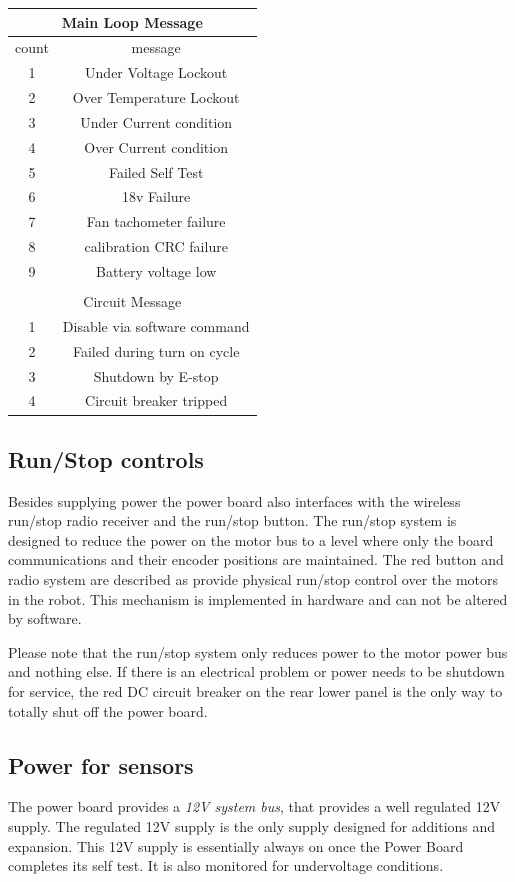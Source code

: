 \begin{tabular}{|c|c|}
\hline
\multicolumn{2}{|c|}{Main Loop Message} \\
\hline
count &  message \\
\hline
\hline
1 & Under Voltage Lockout \\
\hline
2 & Over Temperature Lockout \\
\hline
3 & Under Current condition \\
\hline
4 & Over Current condition \\
\hline
5 & Failed Self Test \\
\hline
6 & 18v Failure \\
\hline
7 & Fan tachometer failure \\
\hline
8 & calibration CRC failure \\
\hline
9 & Battery voltage low  \\
\hline
& \\
\hline
\multicolumn{2}{|c|}{Circuit Message} \\
\hline
1 & Disable via software command \\
\hline
2 & Failed during turn on cycle \\
\hline
3 & Shutdown by E-stop \\
\hline
4 & Circuit breaker tripped  \\
\hline
\end{tabular}

\subsection {Run/Stop controls}

Besides supplying power the power board also interfaces with the wireless run/stop
radio receiver and the run/stop button. The run/stop system is
designed to reduce the power on the motor bus to a level where only the board
communications and their encoder positions are maintained. The red button and
radio system are described as provide physical run/stop control over the
motors in the robot. This mechanism is
implemented in hardware and can not be altered by software.

Please note that the run/stop system only reduces power to the motor power bus
and nothing else. If there is an electrical problem or power needs to be
shutdown for service, the red DC circuit breaker on the rear lower panel is the
only way to totally shut off the power board.


\subsection{Power for sensors}
The power board provides a \emph{12V system bus}, that
provides a well regulated 12V supply. The regulated 12V supply is the only
supply designed for additions and expansion. This 12V supply is essentially
always on once the Power Board completes its self test. It is also monitored for
undervoltage conditions.

